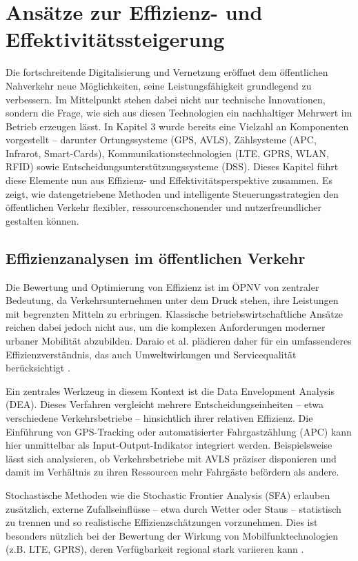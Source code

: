 \section{Ansätze zur Effizienz- und Effektivitätssteigerung}

Die fortschreitende Digitalisierung und Vernetzung eröffnet dem öffentlichen Nahverkehr neue Möglichkeiten, seine Leistungsfähigkeit grundlegend zu verbessern. Im Mittelpunkt stehen dabei nicht nur technische Innovationen, sondern die Frage, wie sich aus diesen Technologien ein nachhaltiger Mehrwert im Betrieb erzeugen lässt. In Kapitel 3 wurde bereits eine Vielzahl an Komponenten vorgestellt – darunter Ortungssysteme (GPS, AVLS), Zählsysteme (APC, Infrarot, Smart-Cards), Kommunikationstechnologien (LTE, GPRS, WLAN, RFID) sowie Entscheidungsunterstützungssysteme (DSS). Dieses Kapitel führt diese Elemente nun aus Effizienz- und Effektivitätsperspektive zusammen. Es zeigt, wie datengetriebene Methoden und intelligente Steuerungsstrategien den öffentlichen Verkehr flexibler, ressourcenschonender und nutzerfreundlicher gestalten können.

\subsection{Effizienzanalysen im öffentlichen Verkehr}

Die Bewertung und Optimierung von Effizienz ist im ÖPNV von zentraler Bedeutung, da Verkehrsunternehmen unter dem Druck stehen, ihre Leistungen mit begrenzten Mitteln zu erbringen. Klassische betriebswirtschaftliche Ansätze reichen dabei jedoch nicht aus, um die komplexen Anforderungen moderner urbaner Mobilität abzubilden. Daraio et al. plädieren daher für ein umfassenderes Effizienzverständnis, das auch Umweltwirkungen und Servicequalität berücksichtigt \cite{Daraio2016}.

Ein zentrales Werkzeug in diesem Kontext ist die Data Envelopment Analysis (DEA). Dieses Verfahren vergleicht mehrere Entscheidungseinheiten – etwa verschiedene Verkehrsbetriebe – hinsichtlich ihrer relativen Effizienz. Die Einführung von GPS-Tracking oder automatisierter Fahrgastzählung (APC) kann hier unmittelbar als Input-Output-Indikator integriert werden. Beispielsweise lässt sich analysieren, ob Verkehrsbetriebe mit AVLS präziser disponieren und damit im Verhältnis zu ihren Ressourcen mehr Fahrgäste befördern als andere.

Stochastische Methoden wie die Stochastic Frontier Analysis (SFA) erlauben zusätzlich, externe Zufallseinflüsse – etwa durch Wetter oder Staus – statistisch zu trennen und so realistische Effizienzschätzungen vorzunehmen. Dies ist besonders nützlich bei der Bewertung der Wirkung von Mobilfunktechnologien (z.B. LTE, GPRS), deren Verfügbarkeit regional stark variieren kann \cite{SacotoCabrera2017}.

